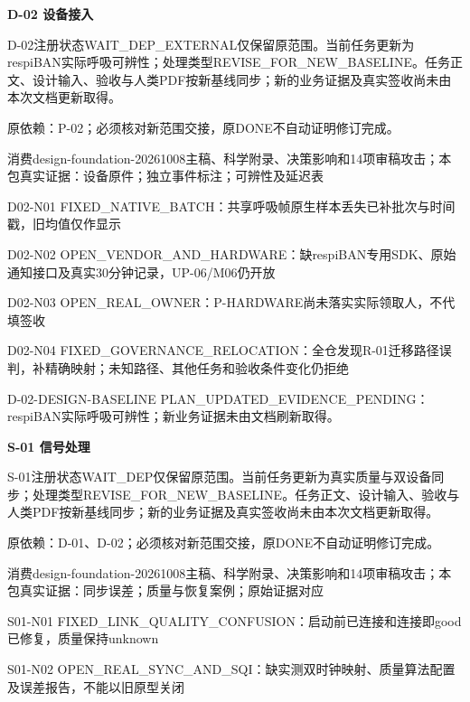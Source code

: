\documentclass[11pt,a4paper]{article}
\newcommand{\reviewsection}[1]{\par\Needspace{5\baselineskip}\vspace{10pt}\begin{center}{\titlelatin\titlecjk\bfseries\fontsize{14}{20}\selectfont #1}\end{center}}
\begin{document}
\reviewsection{D-\allowbreak{}02 设备接入}
D-\allowbreak{}02注册状态WAIT\_\allowbreak{}DEP\_\allowbreak{}EXTERNAL仅保留原范围。当前任务更新为respiBAN实际呼吸可辨性；处理类型REVISE\_\allowbreak{}FOR\_\allowbreak{}NEW\_\allowbreak{}BASELINE。任务正文、设计输入、验收与人类PDF按新基线同步；新的业务证据及真实签收尚未由本次文档更新取得。


原依赖：P-\allowbreak{}02；必须核对新范围交接，原DONE不自动证明修订完成。


消费design-\allowbreak{}foundation-\allowbreak{}20261008主稿、科学附录、决策影响和14项审稿攻击；本包真实证据：设备原件；独立事件标注；可辨性及延迟表


D02-\allowbreak{}N01 FIXED\_\allowbreak{}NATIVE\_\allowbreak{}BATCH：共享呼吸帧原生样本丢失已补批次与时间戳，旧均值仅作显示


D02-\allowbreak{}N02 OPEN\_\allowbreak{}VENDOR\_\allowbreak{}AND\_\allowbreak{}HARDWARE：缺respiBAN专用SDK、原始通知接口及真实30分钟记录，UP-\allowbreak{}06/\allowbreak{}M06仍开放


D02-\allowbreak{}N03 OPEN\_\allowbreak{}REAL\_\allowbreak{}OWNER：P-\allowbreak{}HARDWARE尚未落实实际领取人，不代填签收


D02-\allowbreak{}N04 FIXED\_\allowbreak{}GOVERNANCE\_\allowbreak{}RELOCATION：全仓发现R-\allowbreak{}01迁移路径误判，补精确映射；未知路径、其他任务和验收条件变化仍拒绝


D-\allowbreak{}02-\allowbreak{}DESIGN-\allowbreak{}BASELINE PLAN\_\allowbreak{}UPDATED\_\allowbreak{}EVIDENCE\_\allowbreak{}PENDING：respiBAN实际呼吸可辨性；新业务证据未由文档刷新取得。


\reviewsection{S-\allowbreak{}01 信号处理}
S-\allowbreak{}01注册状态WAIT\_\allowbreak{}DEP仅保留原范围。当前任务更新为真实质量与双设备同步；处理类型REVISE\_\allowbreak{}FOR\_\allowbreak{}NEW\_\allowbreak{}BASELINE。任务正文、设计输入、验收与人类PDF按新基线同步；新的业务证据及真实签收尚未由本次文档更新取得。


原依赖：D-\allowbreak{}01、D-\allowbreak{}02；必须核对新范围交接，原DONE不自动证明修订完成。


消费design-\allowbreak{}foundation-\allowbreak{}20261008主稿、科学附录、决策影响和14项审稿攻击；本包真实证据：同步误差；质量与恢复案例；原始证据对应


S01-\allowbreak{}N01 FIXED\_\allowbreak{}LINK\_\allowbreak{}QUALITY\_\allowbreak{}CONFUSION：启动前已连接和连接即good已修复，质量保持unknown


S01-\allowbreak{}N02 OPEN\_\allowbreak{}REAL\_\allowbreak{}SYNC\_\allowbreak{}AND\_\allowbreak{}SQI：缺实测双时钟映射、质量算法配置及误差报告，不能以旧原型关闭
\end{document}
